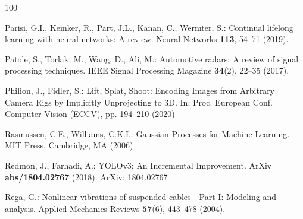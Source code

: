 \documentclass[graybox,envcountchap]{style/SNmono}
\begin{document}
\begin{thebibliography}{100}

Parisi, G.I., Kemker, R., Part, J.L., Kanan, C., Wermter, S.: Continual
  lifelong learning with neural networks: A review.
\newblock Neural Networks \textbf{113}, 54--71 (2019).
\newblock {}



Patole, S., Torlak, M., Wang, D., Ali, M.: Automotive radars: A review of
  signal processing techniques.
\newblock IEEE Signal Processing Magazine \textbf{34}(2), 22--35 (2017).
\newblock {}


{\color{red} 
Philion, J., Fidler, S.: {Lift, Splat, Shoot: Encoding Images from Arbitrary
  Camera Rigs by Implicitly Unprojecting to 3D}.
\newblock In: Proc. European Conf. Computer Vision (ECCV), pp. 194--210 (2020)

\par}
{\color{red} 
Rasmussen, C.E., Williams, C.K.I.: Gaussian Processes for Machine Learning.
\newblock MIT Press, Cambridge, MA (2006)

\par}
{\color{red} 
Redmon, J., Farhadi, A.: {YOLOv}3: {An} {Incremental} {Improvement}.
\newblock ArXiv \textbf{abs/1804.02767} (2018).
\newblock ArXiv: 1804.02767

\par}

Rega, G.: Nonlinear vibrations of suspended cables---{P}art {I}: Modeling and
  analysis.
\newblock Applied Mechanics Reviews \textbf{57}(6), 443--478 (2004).
\newblock {}



\end{thebibliography}
\end{document}
